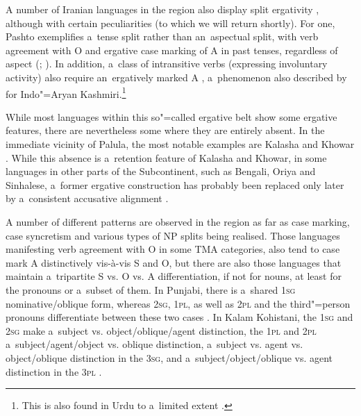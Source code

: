 A number of Iranian languages in the region also display split ergativity \citep{payne1980}, although with certain peculiarities (to which we will return shortly). For one, Pashto exemplifies a~tense split rather than an~aspectual split, with verb agreement with O and ergative case marking of A in past tenses, regardless of aspect (\citealt[4--5]{tegey1977}; \citealt[71--72]{lorenz1979}). In addition, a~class of intransitive verbs (expressing involuntary activity) also require an~ergatively marked A \citep[112]{babrakzai1999}, a~phenomenon also described by \citet[217]{hookkoul2004} for Indo"=Aryan Kashmiri.\footnote{This is also found in Urdu to a~limited extent \citep[168]{schmidt1999}.} 



While most languages within this so"=called ergative belt show some ergative features, there are nevertheless some where they are entirely absent. In the immediate vicinity of Palula, the most notable examples are Kalasha and Khowar \citep[41]{bashir1988}. While this absence is a~retention feature of Kalasha and Khowar, in some languages in other parts of the Subcontinent, such as Bengali, Oriya and Sinhalese, a~former ergative construction has probably been replaced only later by a~consistent accusative alignment \citep[343--344]{masica1991}.



A number of different patterns are observed in the region as far as case marking, case syncretism and various types of NP splits being realised. Those languages manifesting verb agreement with O in some TMA categories, also tend to case mark A distinctively vis-à-vis S and O, but there are also those languages that maintain a~tripartite S vs. O vs. A differentiation, if not for nouns, at least for the pronouns or a~subset of them. In Punjabi, there is a~shared \textsc{1sg} nominative/oblique form, whereas \textsc{2sg}, \textsc{1pl}, as well as \textsc{2pl} and the third"=person pronouns differentiate between these two cases \citep[229]{bhatia1993}. In Kalam Kohistani, the \textsc{1sg} and \textsc{2sg} make a~subject vs. object/oblique/agent distinction, the \textsc{1pl} and \textsc{2pl} a~subject/agent/object vs. oblique distinction, a~subject vs. agent vs. object/oblique distinction in the \textsc{3sg}, and a~subject/object/oblique vs. agent distinction in the \textsc{3pl} \citep[39]{baart1999a}. 



